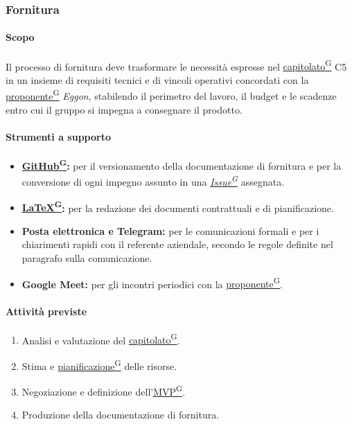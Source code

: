 \documentclass[a4paper,12pt]{article}
\providecommand{\glslink}[2]{\href{https://alittlebyte-19.github.io/Documentazione/glossario.html\#gls-#1}{\underline{#2}\textsuperscript{\scriptsize G}}}
\begin{document}
\subsubsection{Fornitura}

\paragraph{Scopo}
Il processo di fornitura deve trasformare le necessità espresse nel \glslink{capitolato}{capitolato} C5 in un insieme di requisiti tecnici e di vincoli operativi concordati con la \glslink{committente-proponente}{proponente} \textit{Eggon}, stabilendo il perimetro del lavoro, il budget e le scadenze entro cui il gruppo si impegna a consegnare il prodotto.

\paragraph{Strumenti a supporto}
\begin{itemize}
    \item \textbf{\glslink{github}{GitHub}:} per il versionamento della documentazione di fornitura e per la conversione di ogni impegno assunto in una \textit{\glslink{issue}{Issue}} assegnata.
    \item \textbf{\glslink{latex}{LaTeX}:} per la redazione dei documenti contrattuali e di pianificazione.
    \item \textbf{Posta elettronica e Telegram:} per le comunicazioni formali e per i chiarimenti rapidi con il referente aziendale, secondo le regole definite nel paragrafo sulla comunicazione.
    \item \textbf{Google Meet:} per gli incontri periodici con la \glslink{committente-proponente}{proponente}.
\end{itemize}

\paragraph{Attività previste}
\begin{enumerate}
    \item Analisi e valutazione del \glslink{capitolato}{capitolato}.
    \item Stima e \glslink{pianificazione}{pianificazione} delle risorse.
    \item Negoziazione e definizione dell'\glslink{mvp-minimum-viable-product}{MVP}.
    \item Produzione della documentazione di fornitura.
\end{enumerate}
\end{document}
